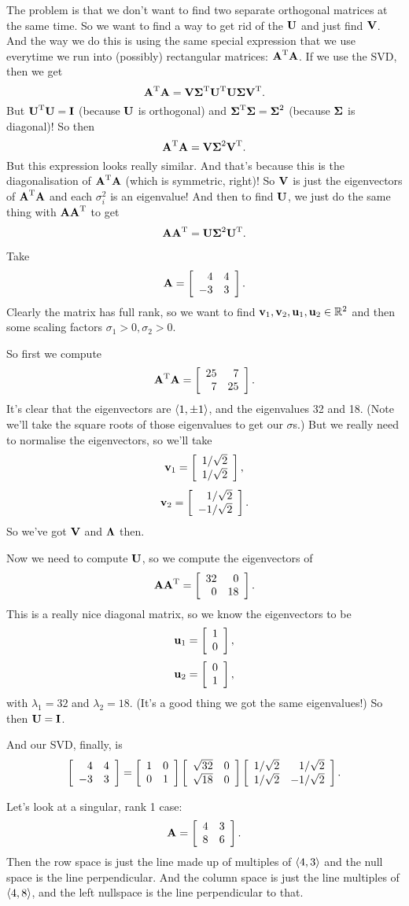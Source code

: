 The problem is that we don't want to find two separate orthogonal matrices at the same time. So we want to find a way to get rid of the $\mU$ and just find $\mV$. And the way we do this is using the same special expression that we use everytime we run into (possibly) rectangular matrices: $\T\mA \mA$. If we use the SVD, then we get
\[ \T\mA\mA = \mV\T\mSg\T\mU\mU\mSg\T\mV. \]
But $\T\mU\mU = \mI$ (because $\mU$ is orthogonal) and $\T\mSg\mSg = \mSg^2$ (because $\mSg$ is diagonal)! So then
\[ \T\mA\mA = \mV \mSg^2 \T\mV. \]
But this expression looks really similar. And that's because this is the diagonalisation of $\T\mA\mA$ (which is symmetric, right)! So $\mV$ is just the eigenvectors of $\T\mA\mA$ and each $\sigma_i^2$ is an eigenvalue! And then to find $\mU$, we just do the same thing with $\mA\T\mA$ to get
\[ \mA\T\mA = \mU \mSg^2 \T\mU. \]

\bex
Take
\[ \mA = \mat{4&4\\-3&3}. \]
Clearly the matrix has full rank, so we want to find $\vv_1, \vv_2, \vu_1, \vu_2 \in \RR^2$ and then some scaling factors $\sigma_1 > 0, \sigma_2 > 0$.

So first we compute 
\[ \T\mA\mA = \mat{25&7\\7&25}. \]
It's clear that the eigenvectors are $\rvec{1,\pm 1}$, and the eigenvalues 32 and 18. (Note we'll take the square roots of those eigenvalues to get our $\sigma$s.) But we really need to normalise the eigenvectors, so we'll take
\[ \vv_1 = \mat{1/\sqrt{2}\\1/\sqrt{2}}, \]
\[ \vv_2 = \mat{1/\sqrt{2}\\-1/\sqrt{2}}. \]
So we've got $\mV$ and $\mLa$ then.

Now we need to compute $\mU$, so we compute the eigenvectors of
\[ \mA\T\mA = \mat{32&0\\0&18}. \]
This is a really nice diagonal matrix, so we know the eigenvectors to be
\[ \vu_1 = \mat{1\\0}, \]
\[ \vu_2 = \mat{0\\1}, \]
with $\lambda_1 = 32$ and $\lambda_2 = 18$. (It's a good thing we got the same eigenvalues!) So then $\mU = \mI$.

And our SVD, finally, is
\[ \mat{4&4\\-3&3} = \mat{1&0\\0&1}\mat{\sqrt{32}&0\\\sqrt{18}&0}\mat{1/\sqrt{2}&1/\sqrt{2}\\1/\sqrt{2}&-1/\sqrt{2}}. \]
\eex

\bex
Let's look at a singular, rank 1 case:
\[ \mA = \mat{4&3\\8&6}. \]
Then the row space is just the line made up of multiples of $\rvec{4,3}$ and the null space is the line perpendicular. And the column space is just the line multiples of $\rvec{4,8}$, and the left nullspace is the line perpendicular to that.

